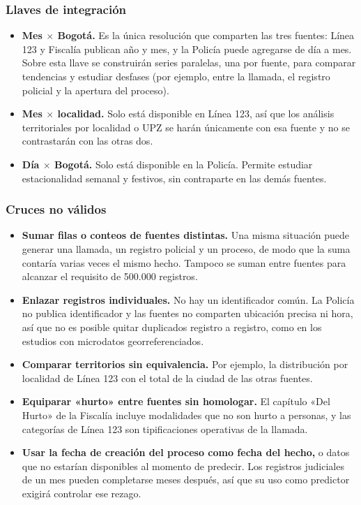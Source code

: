 \subsubsection{Llaves de integración}

\begin{itemize}
  \item \textbf{Mes $\times$ Bogotá.} Es la única resolución que comparten las tres fuentes: Línea 123 y Fiscalía publican año y mes, y la Policía puede agregarse de día a mes. Sobre esta llave se construirán series paralelas, una por fuente, para comparar tendencias y estudiar desfases (por ejemplo, entre la llamada, el registro policial y la apertura del proceso).
  \item \textbf{Mes $\times$ localidad.} Solo está disponible en Línea 123, así que los análisis territoriales por localidad o UPZ se harán únicamente con esa fuente y no se contrastarán con las otras dos.
  \item \textbf{Día $\times$ Bogotá.} Solo está disponible en la Policía. Permite estudiar estacionalidad semanal y festivos, sin contraparte en las demás fuentes.
\end{itemize}

\subsubsection{Cruces no válidos}

\begin{itemize}
  \item \textbf{Sumar filas o conteos de fuentes distintas.} Una misma situación puede generar una llamada, un registro policial y un proceso, de modo que la suma contaría varias veces el mismo hecho. Tampoco se suman entre fuentes para alcanzar el requisito de 500.000 registros.
  \item \textbf{Enlazar registros individuales.} No hay un identificador común. La Policía no publica identificador y las fuentes no comparten ubicación precisa ni hora, así que no es posible quitar duplicados registro a registro, como en los estudios con microdatos georreferenciados.
  \item \textbf{Comparar territorios sin equivalencia.} Por ejemplo, la distribución por localidad de Línea 123 con el total de la ciudad de las otras fuentes.
  \item \textbf{Equiparar «hurto» entre fuentes sin homologar.} El capítulo «Del Hurto» de la Fiscalía incluye modalidades que no son hurto a personas, y las categorías de Línea 123 son tipificaciones operativas de la llamada.
  \item \textbf{Usar la fecha de creación del proceso como fecha del hecho,} o datos que no estarían disponibles al momento de predecir. Los registros judiciales de un mes pueden completarse meses después, así que su uso como predictor exigirá controlar ese rezago.
\end{itemize}

